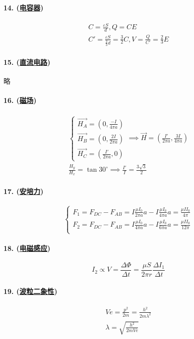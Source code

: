 \paragraph{14. (\hyperref[subsec:电容器]{电容器})}

\begin{gather*}
    C=\frac{\varepsilon S}{d},Q=CE\\
    C'=\frac{\varepsilon S}{\frac23d}=\frac32C,
    V=\frac{Q}{C'}=\frac23E
\end{gather*}

\paragraph{15. (\hyperref[subsec:直流电路]{直流电路})} 略
\paragraph{16. (\hyperref[subsec:磁场]{磁场})}

\begin{gather*}
    \begin{cases}
        \vec{H_A}=\left(0,\frac{-I}{4\pi a}\right)\\
        \vec{H_B}=\left(0,\frac{2I}{2\pi a}\right)\\
        \vec{H_C}=\left(\frac{I'}{2\pi a},0\right)
    \end{cases}\implies
    \vec{H}=\left(\frac{I'}{2\pi a},\frac{3I}{4\pi a}\right)\\
    \frac{H_y}{H_x}=\tan30^\circ\implies
    \frac{I'}{I}=\frac{3\sqrt3}{2}
\end{gather*}

\paragraph{17. (\hyperref[subsec:安培力]{安培力})}

\begin{equation*}
    \begin{cases}
        F_1=F_{DC}-F_{AB}
        =I\frac{\mu I_0}{2\pi a}a-I\frac{\mu I_0}{4\pi a}a
        =\frac{\mu II_0}{4\pi}\\
        F_2=F_{DC}-F_{AB}
        =I\frac{\mu I_0}{4\pi a}a-I\frac{\mu I_0}{6\pi a}a
        =\frac{\mu II_0}{12\pi}\\
    \end{cases}
\end{equation*}

\paragraph{18. (\hyperref[subsec:电磁感应]{电磁感应})}

\begin{equation*}
    I_2\propto V=\frac{\Delta\Phi}{\Delta t}
    =\frac{\mu S}{2\pi r}\frac{\Delta I_1}{\Delta t}
\end{equation*}

\paragraph{19. (\hyperref[sec:波粒二象性]{波粒二象性})}

\begin{gather*}
    Ve=\frac{p^2}{2m}=\frac{h^2}{2m\lambda^2}\\
    \lambda=\sqrt{\frac{h^2}{2mVe}}
\end{gather*}
